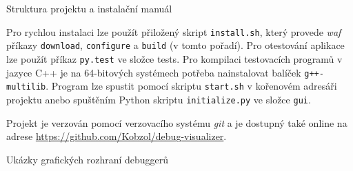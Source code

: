 \documentclass[czech,bachelor,male,python,dept460]{diploma}						%
\newcommand{\parspace}[1][]{
	\ifthenelse{\isempty{#1}}{\vspace{5mm}}{\vspace{#1}}
	\par
}
\begin{document}
\begin{section}{Struktura projektu a instalační manuál}
	\parspace Pro rychlou instalaci lze použít přiložený skript \texttt{install.sh}, který provede \textit{waf} příkazy \texttt{download}, \texttt{configure}
	a \texttt{build} (v tomto pořadí).
	Pro otestování aplikace lze použít příkaz \texttt{py.test} ve složce tests. Pro kompilaci testovacích programů v jazyce C++ je na 64-bitových systémech
	potřeba nainstalovat balíček \texttt{g++-multilib}.
	Program lze spustit pomocí skriptu \texttt{start.sh} v kořenovém adresáři projektu anebo spuštěním Python skriptu \texttt{initialize.py} ve složce \texttt{gui}.
	
	\vspace{5mm}
	
	Projekt je verzován pomocí verzovacího systému \textit{git} a je dostupný také online na adrese \url{https://github.com/Kobzol/debug-visualizer}.
\end{section}

\begin{section}{Ukázky grafických rozhraní debuggerů}
\label{appendix:gui}
\end{section}

\clearpage
\end{document}
